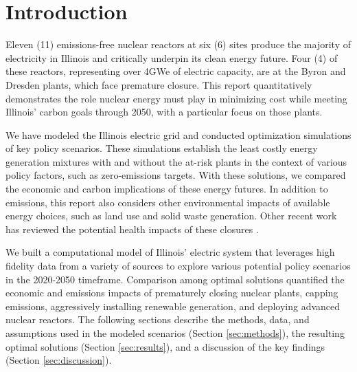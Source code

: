 \section{Introduction}\label{sec:intro}
Eleven (11) emissions-free nuclear reactors at six (6) sites produce the majority of
electricity in Illinois and critically underpin its clean energy future. Four 
(4) of these reactors, representing over 4GWe of electric capacity, are at the Byron 
and Dresden plants, which face premature closure. This
report quantitatively demonstrates the role nuclear energy must play in
minimizing cost while meeting Illinois’ carbon goals through 2050, with a 
particular focus on those plants. 

We have 
modeled the Illinois electric grid and conducted optimization simulations of 
key policy scenarios. These simulations establish the least costly energy 
generation mixtures with and without the at-risk plants in the context of 
various policy factors, such as zero-emissions targets. 
With these solutions, we compared the economic and carbon implications of these energy futures. 
In addition to emissions, this report also considers
other environmental impacts of available energy choices, such as land use and
solid waste generation. Other recent work has reviewed the potential health 
impacts of these closures \cite{catf_potential_2021}.

We built a computational model of Illinois' electric system that leverages high 
fidelity data from a variety of sources to explore various potential policy 
scenarios in the 2020-2050 timeframe.  Comparison among optimal solutions 
quantified the economic and emissions impacts of prematurely closing nuclear 
plants, capping emissions, aggressively installing renewable generation, and 
deploying advanced nuclear reactors.  The following sections describe the 
methods, data, and assumptions used in the modeled scenarios (Section 
\ref{sec:methods}), the resulting optimal solutions (Section 
\ref{sec:results}), and a discussion of the key findings (Section 
\ref{sec:discussion}).  

